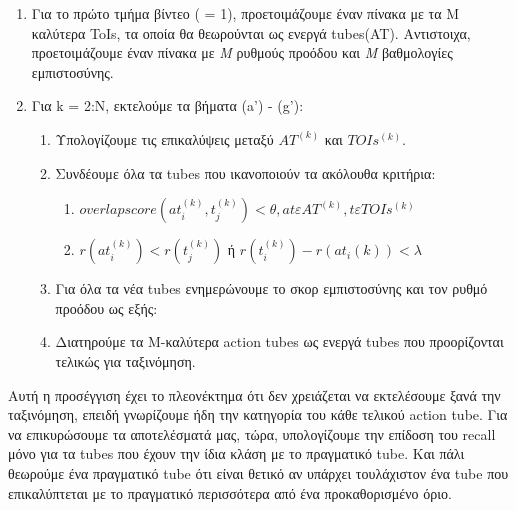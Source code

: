 \begin{enumerate}
\item Για το πρώτο τμήμα βίντεο ( = 1), προετοιμάζουμε έναν πίνακα με τα Μ καλύτερα \en ToIs\gr,  τα  οποία θα θεωρούνται
  ως ενεργά \en tubes\gr(AT).
Αντιστοιχα, προετοιμάζουμε έναν πίνακα με \textit{M} ρυθμούς προόδου και \textit{M} βαθμολογίες εμπιστοσύνης.
\item Για \en k = 2:N\gr, εκτελούμε τα βήματα (a') - (g'):
  \begin{enumerate}
  \item Υπολογίζουμε τις επικαλύψεις μεταξύ $ AT^{(k)} $ και $ TOIs^{(k)}. $
  \item Συνδέουμε όλα τα \en tubes \gr που ικανοποιούν τα ακόλουθα κριτήρια:
    \begin{enumerate}
    \item $ overlap score(at_i^{(k)},t_j^{(k)})   < \theta, 
      at  \varepsilon AT^{(k)}, t \varepsilon TOIs^{(k)}  $
    \item $r(at_i^{(k)}) < r(t_j^{(k)}) $ ή
      $r(t_i^{(k)}) - r(at_i{(k)}) < \lambda $
    \end{enumerate}
    
  \item Για όλα τα νέα \en tubes \gr ενημερώνουμε το σκορ εμπιστοσύνης και τον ρυθμό προόδου ως εξής:

  \item Διατηρούμε  τα M-καλύτερα \en action tubes \gr  ως ενεργά \en tubes \gr που προορίζονται τελικώς για ταξινόμηση.
  \end{enumerate}
  
\end{enumerate}

Αυτή η προσέγγιση έχει το πλεονέκτημα ότι δεν χρειάζεται να εκτελέσουμε ξανά την ταξινόμηση, επειδή γνωρίζουμε ήδη την κατηγορία του
κάθε τελικού \en action tube\gr. Για να επικυρώσουμε τα αποτελέσματά μας, τώρα, υπολογίζουμε την επίδοση του \en recall \gr μόνο για τα \en tubes \gr
που έχουν την ίδια κλάση με το πραγματικό \en tube\gr. Και πάλι θεωρούμε ένα πραγματικό  \en tube \gr ότι είναι θετικό αν υπάρχει
τουλάχιστον ένα \en tube \gr που επικαλύπτεται με το πραγματικό περισσότερα από ένα προκαθορισμένο όριο.

